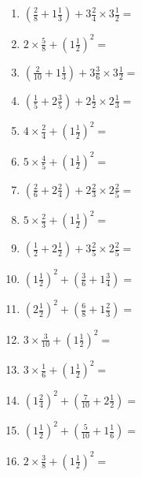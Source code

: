 \documentclass[12pt]{article}
\begin{document}
\begin{enumerate}
\item \large $ (\frac{2}{8} + 1 \frac{1}{3}) + 3 \frac{2}{4} \times 3 \frac{1}{2} = $ \vspace{1.8cm}
\item \large $ 2 \times \frac{5}{8} + (1 \frac{1}{2})^2 = $ \vspace{1.8cm}
\item \large $ (\frac{2}{10} + 1 \frac{1}{3}) + 3 \frac{3}{6} \times 3 \frac{1}{2} = $ \vspace{1.8cm}
\item \large $ (\frac{1}{5} + 2 \frac{3}{5}) + 2 \frac{1}{2} \times 2 \frac{1}{3} = $ \vspace{1.8cm}
\item \large $ 4 \times \frac{2}{4} + (1 \frac{1}{2})^2 = $ \vspace{1.8cm}
\newpage
\item \large $ 5 \times \frac{4}{5} + (1 \frac{1}{2})^2 = $ \vspace{1.8cm}
\item \large $ (\frac{2}{6} + 2 \frac{2}{4}) + 2 \frac{2}{3} \times 2 \frac{2}{5} = $ \vspace{1.8cm}
\item \large $ 5 \times \frac{2}{3} + (1 \frac{1}{2})^2 = $ \vspace{1.8cm}
\item \large $ (\frac{1}{2} + 2 \frac{1}{2}) + 3 \frac{2}{5} \times 2 \frac{2}{5} = $ \vspace{1.8cm}
\item \large $ (1 \frac{1}{2})^2 + (\frac{3}{6} + 1 \frac{3}{4}) = $ \vspace{1.8cm}
\item \large $ (2 \frac{1}{2})^2 + (\frac{6}{8} + 1 \frac{2}{3}) = $ \vspace{1.8cm}
\item \large $ 3 \times \frac{3}{10} + (1 \frac{1}{2})^2 = $ \vspace{1.8cm}
\item \large $ 3 \times \frac{1}{6} + (1 \frac{1}{2})^2 = $ \vspace{1.8cm}
\item \large $ (1 \frac{2}{4})^2 + (\frac{7}{10} + 2 \frac{1}{2}) = $ \vspace{1.8cm}
\item \large $ (1 \frac{1}{2})^2 + (\frac{5}{10} + 1 \frac{1}{6}) = $ \vspace{1.8cm}
\newpage
\item \large $ 2 \times \frac{3}{8} + (1 \frac{1}{2})^2 = $ \vspace{1.8cm}

\end{enumerate}
\end{document}
